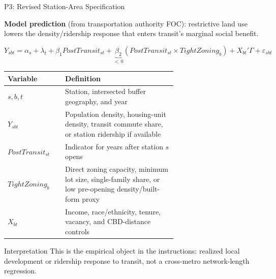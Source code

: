 \documentclass[10pt]{beamer}
\begin{document}
\begin{frame}[shrink=5]{P3: Revised Station-Area Specification}

\textbf{Model prediction} (from transportation authority FOC):
restrictive land use lowers the density/ridership response that enters transit's
marginal social benefit.

\[
  Y_{sbt}
  =
  \alpha_s+\lambda_t
  + \beta_1 PostTransit_{st}
  + \underbrace{\beta_2}_{<\,0}
      (PostTransit_{st}\times TightZoning_b)
  + X_{bt}'\Gamma+\varepsilon_{sbt}
\]

\small
\renewcommand{\arraystretch}{1.25}
\begin{tabular}{@{}lp{0.66\linewidth}@{}}
\toprule
Variable & Definition \\
\midrule
$s,b,t$ & Station, intersected buffer geography, and year \\[3pt]
$Y_{sbt}$ & Population density, housing-unit density, transit commute share,
or station ridership if available \\[3pt]
$PostTransit_{st}$ & Indicator for years after station $s$ opens \\[3pt]
$TightZoning_b$ & Direct zoning capacity, minimum lot size, single-family share,
or low pre-opening density/built-form proxy \\[3pt]
$X_{bt}$ & Income, race/ethnicity, tenure, vacancy, and CBD-distance controls \\
\bottomrule
\end{tabular}

\vspace{0.15cm}
\begin{alertblock}{Interpretation}
\small
This is the empirical object in the instructions: realized local development or
ridership response to transit, not a cross-metro network-length regression.
\end{alertblock}

\end{frame}
\end{document}
